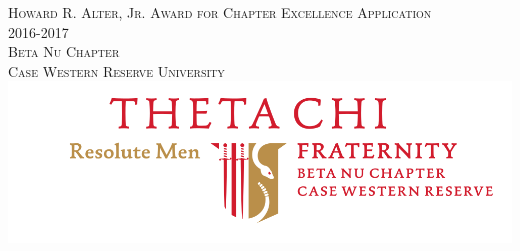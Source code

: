 \documentclass[oneside,openany]{book}
\begin{document}
  \begin{titlepage}
    \begin{center}
      \textsc{\Huge Howard R. Alter, Jr. Award for Chapter Excellence Application } \\[0.5cm]
      \textsc{\Huge 2016-2017} \\[1.0cm]
      \textsc{\Large Beta Nu Chapter} \\[0.3cm]
      \textsc{\Large Case Western Reserve University} \\[1.5cm]
      \includegraphics[scale=0.50]{betanulogo.png}
    \end{center}
  \end{titlepage}

  \tableofcontents

  \frontmatter
    

  \mainmatter
    
    
    
    
    
    
    
    
    
    
    
    
    
\end{document}
